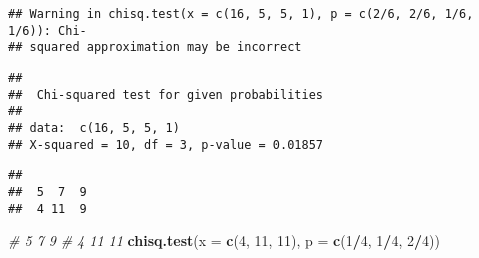 \documentclass[]{article}
\newenvironment{Shaded}{\begin{snugshade}}{\end{snugshade}}
\newcommand{\CommentTok}[1]{\textcolor[rgb]{0.56,0.35,0.01}{\textit{#1}}}
\newcommand{\DataTypeTok}[1]{\textcolor[rgb]{0.13,0.29,0.53}{#1}}
\newcommand{\DecValTok}[1]{\textcolor[rgb]{0.00,0.00,0.81}{#1}}
\newcommand{\KeywordTok}[1]{\textcolor[rgb]{0.13,0.29,0.53}{\textbf{#1}}}
\newcommand{\NormalTok}[1]{#1}
\newcommand{\OperatorTok}[1]{\textcolor[rgb]{0.81,0.36,0.00}{\textbf{#1}}}
\newcommand{\OtherTok}[1]{\textcolor[rgb]{0.56,0.35,0.01}{#1}}
\newcommand{\StringTok}[1]{\textcolor[rgb]{0.31,0.60,0.02}{#1}}
\begin{document}
\begin{verbatim}
## Warning in chisq.test(x = c(16, 5, 5, 1), p = c(2/6, 2/6, 1/6, 1/6)): Chi-
## squared approximation may be incorrect
\end{verbatim}

\begin{verbatim}
## 
##  Chi-squared test for given probabilities
## 
## data:  c(16, 5, 5, 1)
## X-squared = 10, df = 3, p-value = 0.01857
\end{verbatim}

\begin{Shaded}
\end{Shaded}

\begin{verbatim}
## 
##  5  7  9 
##  4 11  9
\end{verbatim}

\begin{Shaded}
\begin{Highlighting}[]
\CommentTok{# 5  7  9}
\CommentTok{# 4 11 11}
\KeywordTok{chisq.test}\NormalTok{(}\DataTypeTok{x =} \KeywordTok{c}\NormalTok{(}\DecValTok{4}\NormalTok{, }\DecValTok{11}\NormalTok{, }\DecValTok{11}\NormalTok{), }\DataTypeTok{p =} \KeywordTok{c}\NormalTok{(}\DecValTok{1}\OperatorTok{/}\DecValTok{4}\NormalTok{, }\DecValTok{1}\OperatorTok{/}\DecValTok{4}\NormalTok{, }\DecValTok{2}\OperatorTok{/}\DecValTok{4}\NormalTok{))}
\end{Highlighting}
\end{Shaded}
\end{document}
